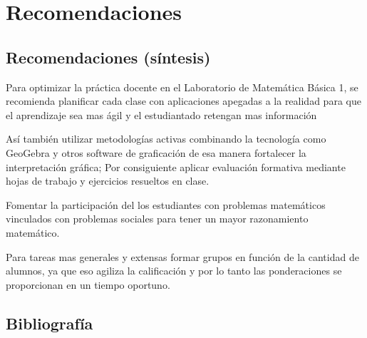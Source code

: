 \documentclass[12pt]{article}
\let\oldsection\section
\renewcommand{\section}{\clearpage\oldsection}
\begin{document}
	
	
	
	
	

	
	\section{Recomendaciones}
	
	\subsection{Recomendaciones (síntesis)}
	Para optimizar la práctica docente en el Laboratorio de Matemática Básica 1, se recomienda planificar cada clase con aplicaciones apegadas a la realidad para que el aprendizaje sea mas ágil y el estudiantado retengan mas información 
	
	Así también utilizar metodologías activas combinando la tecnología como  GeoGebra y otros software de graficación  de esa manera fortalecer la interpretación gráfica; Por consiguiente aplicar evaluación formativa mediante hojas de trabajo y ejercicios resueltos en clase.
	
	Fomentar la participación del los estudiantes con problemas matemáticos vinculados con problemas sociales para tener un mayor razonamiento matemático.
	
	Para tareas mas generales y extensas formar grupos en función de la cantidad de alumnos, ya que eso agiliza la calificación y por lo tanto las ponderaciones se proporcionan en un tiempo oportuno.
	
	
	
	\subsection{Bibliografía }
	
\end{document}
